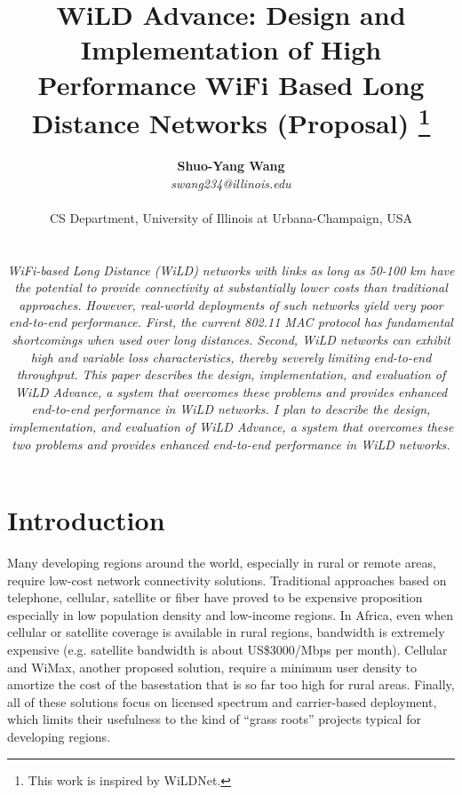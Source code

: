 \documentclass[twocolumn,11pt,twoside]{article}
\begin{document}
\title{WiLD Advance: Design and Implementation of High Performance WiFi Based Long Distance Networks (Proposal)
{\normalfont\thanks{This work is inspired by WiLDNet.}}}

\author{
\begin{tabular}{p{2in} p{1in} p{2in}}
& \multicolumn{1}{c}{\textbf{Shuo-Yang Wang}} & \\
& \multicolumn{1}{c}{\textit{swang234@illinois.edu}} & \\
\end{tabular}\\
CS Department, University of Illinois at Urbana-Champaign, USA\\
\\
\parbox{5.5in}{\textit{
WiFi-based Long Distance (WiLD) networks with links as long as 50-100 km have the potential to provide connectivity at substantially lower costs than traditional approaches. However, real-world deployments of such networks yield very poor end-to-end performance. First, the current 802.11 MAC protocol has fundamental shortcomings when used over long distances. Second, WiLD networks can exhibit high and variable loss characteristics, thereby severely limiting end-to-end throughput. This paper describes the design, implementation, and evaluation of WiLD Advance, a system that overcomes these problems and provides enhanced end-to-end performance in WiLD networks. I plan to describe the design, implementation, and evaluation of WiLD Advance, a system that overcomes these two problems and provides enhanced end-to-end performance in WiLD networks.}}
}

\maketitle
\thispagestyle{fancy}
\normalfont

\section{Introduction}
Many developing regions around the world, especially in rural or remote areas, require low-cost network connectivity solutions. Traditional approaches based on telephone, cellular, satellite or fiber have proved to be expensive proposition especially in low population density and low-income regions. In Africa, even when cellular or satellite coverage is available in rural regions, bandwidth is extremely expensive (e.g. satellite bandwidth is about US\$3000/Mbps per month). Cellular and WiMax, another proposed solution, require a minimum user density to amortize the cost of the basestation that is so far too high for rural areas. Finally, all of these solutions focus on licensed spectrum and carrier-based deployment, which limits their usefulness to the kind of ``grass roots'' projects typical for developing regions.
\end{document}
